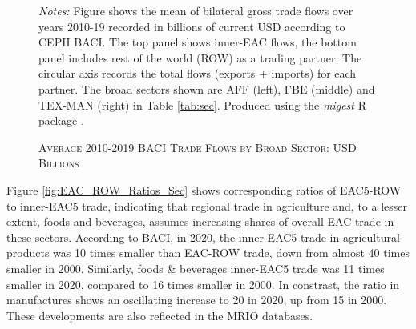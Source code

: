 \documentclass[a4paper]{article}
\begin{document}
\begin{figure}[h!] \vspace{-1mm}
\centering
\caption{\label{fig:MIG_SEC_BACI}\textsc{Average 2010-2019 BACI Trade Flows by Broad Sector: USD Billions}}
\vspace{2mm}
\raggedright
\scriptsize 
\emph{Notes:} Figure shows the mean of bilateral gross trade flows over years 2010-19 recorded in billions of current USD according to CEPII BACI. The top panel shows inner-EAC flows, the bottom panel includes rest of the world (ROW) as a trading partner. The circular axis records the total flows (exports + imports) for each partner. The broad sectors shown are AFF (left), FBE (middle) and TEX-MAN (right) in Table \ref{tab:sec}. Produced using the \emph{migest} R package \citep{rmigest}.
\end{figure}
\FloatBarrier

Figure \ref{fig:EAC_ROW_Ratios_Sec} shows corresponding ratios of EAC5-ROW to inner-EAC5 trade, indicating that regional trade in agriculture and, to a lesser extent, foods and beverages, assumes increasing shares of overall EAC trade in these sectors. According to BACI, in 2020, the inner-EAC5 trade in agricultural products was 10 times smaller than EAC-ROW trade, down from almost 40 times smaller in 2000. Similarly, foods \& beverages inner-EAC5 trade was 11 times smaller in 2020, compared to 16 times smaller in 2000. In constrast, the ratio in manufactures shows an oscillating increase to 20 in 2020, up from 15 in 2000. These developments are also reflected in the MRIO databases. 
\end{document}
